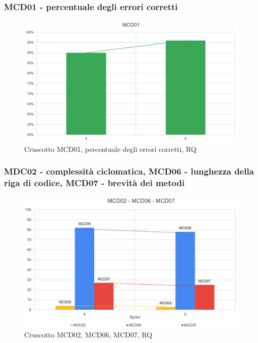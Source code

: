 \subsubsection*{MCD01 - percentuale degli errori corretti}
\begin{figure}[H] 
    \centering
    \includegraphics[scale = 0.5]{immagini/MCD01.png}
    \caption{Cruscotto MCD01, percentuale degli errori corretti, RQ}
\end{figure}

\subsubsection*{MDC02 - complessità ciclomatica, MCD06 - lunghezza della riga di codice, MCD07 - brevità dei metodi}
\begin{figure}[H] 
    \centering
    \includegraphics[scale = 0.55]{immagini/MCD02-06-07.png}
    \caption{Cruscotto MCD02, MCD06, MCD07, RQ}
\end{figure}

